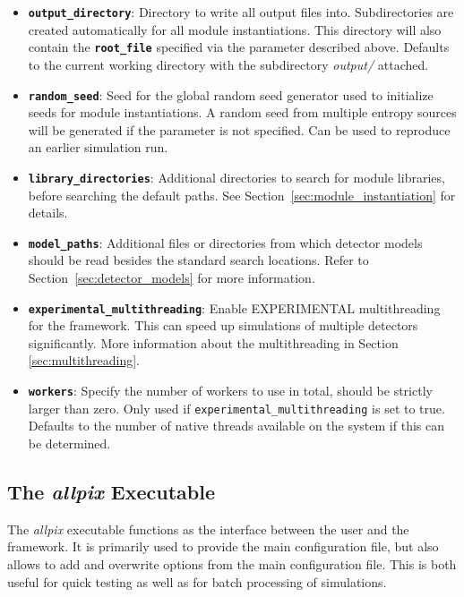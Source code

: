 \begin{itemize}
\item \textbf{\texttt{output\_directory}}: Directory to write all output files into.
Subdirectories are created automatically for all module instantiations.
This directory will also contain the \textbf{\texttt{root\_file}} specified via the parameter described above.
Defaults to the current working directory with the subdirectory \textit{output/} attached.
\item \textbf{\texttt{random\_seed}}: Seed for the global random seed generator used to initialize seeds for module instantiations.
A random seed from multiple entropy sources will be generated if the parameter is not specified.
Can be used to reproduce an earlier simulation run.
\item \textbf{\texttt{library\_directories}}: Additional directories to search for module libraries, before searching the default paths.
See Section~\ref{sec:module_instantiation} for details.
\item \textbf{\texttt{model\_paths}}: Additional files or directories from which detector models should be read besides the standard search locations.
Refer to Section~\ref{sec:detector_models} for more information.
\item \textbf{\texttt{experimental\_multithreading}}: Enable EXPERIMENTAL multithreading for the framework. This can speed up simulations of multiple detectors significantly. More information about the multithreading in Section \ref{sec:multithreading}.
\item \textbf{\texttt{workers}}: Specify the number of workers to use in total, should be strictly larger than zero. Only used if \texttt{experimental\_multithreading} is set to true. Defaults to the number of native threads available on the system if this can be determined.
\end{itemize}

\subsection{The \textit{allpix} Executable}
\label{sec:allpix_executable}
The \textit{allpix} executable functions as the interface between the user and the framework. It is primarily used to provide the main configuration file, but also allows to add and overwrite options from the main configuration file. This is both useful for quick testing as well as for batch processing of simulations.

